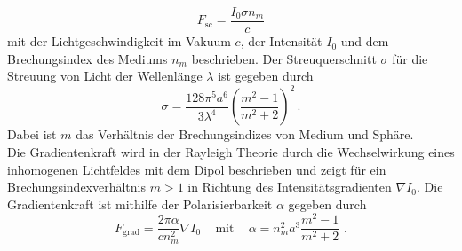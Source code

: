 \begin{equation}
  F_{\text{sc}} = \frac{I_0\sigma n_m}{c}
\end{equation}
mit der Lichtgeschwindigkeit im Vakuum $c$, der Intensität $I_0$ und dem Brechungsindex des Mediums $n_m$ beschrieben.
Der Streuquerschnitt $\sigma$ für die Streuung von Licht der Wellenlänge $\lambda$ ist gegeben durch
\begin{equation}
  \sigma = \frac{128 \pi^5 a^6}{3\lambda^4} \left(\frac{m^2-1}{m^2+2}\right)^2 \, .
\end{equation}
Dabei ist $m$ das Verhältnis der Brechungsindizes von Medium und Sphäre.\\
Die Gradientenkraft wird in der Rayleigh Theorie durch die Wechselwirkung eines inhomogenen Lichtfeldes mit dem Dipol beschrieben und zeigt für ein Brechungsindexverhältnis $m>1$ in Richtung des Intensitätsgradienten $\nabla I_0$. \cite{anleitung} Die Gradientenkraft ist mithilfe der Polarisierbarkeit $\alpha$ gegeben durch
\begin{equation}
  F_{\text{grad}} = \frac{2\pi\alpha}{cn^2_m}\nabla I_0 \,\,\,\,\,\,\, \text{mit} \,\,\,\,\,\,\, \alpha = n_m^2a^3\frac{m^2-1}{m^2+2}\,\,.
\end{equation}

